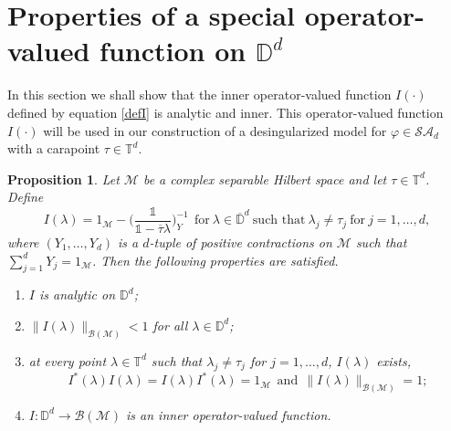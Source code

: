 \documentclass[11pt, reqno]{amsart}
\newtheorem{proposition}[theorem]{Proposition}
\newcommand\1{\boldsymbol {1}}
\numberwithin{equation}{section}
\begin{document}
\section{Properties of a special operator-valued function on $\mathbb{D}^{d}$}\label{Ioflambda}
In this section we shall show that the  inner operator-valued function $I(\cdot)$ defined by equation \eqref{defI}
is analytic and inner. This operator-valued function $I(\cdot)$ will be used in our construction of a desingularized model  for  $\varphi\in\mathcal{SA}_{d}$ with a carapoint $\tau\in\mathbb{T}^{d}$.
\begin{proposition}\label{Ilambdaproperties}
    Let $\mathcal{M}$ be a complex separable  Hilbert space and let $\tau\in\mathbb{T}^{d}$. Define
    \begin{equation}\label{defI}
I(\lambda)=1_{\mathcal{M}}-\bigg(\dfrac{\mathds{1}}{\mathds{1}-\overline{\tau}\lambda}\bigg)^{-1}_{Y}~~\text{for}~\lambda\in\overline{\mathbb{D}}^{d}~\text{such that}~\lambda_{j}\neq\tau_{j}~\text{for}~j=1,\hdots,d,
\end{equation}
where $(Y_{1},\hdots,Y_{d})$ is a $d$-tuple of positive contractions on $\mathcal{M}$ such that $\sum_{j=1}^{d}Y_{j}=1_{\mathcal{M}}$. Then the following properties are satisfied.
\begin{enumerate}
    \item $I$ is analytic on $\mathbb{D}^{d}$;
    \item $\|I(\lambda)\|_{\mathcal{B(M)}}<1$ for all $\lambda\in\mathbb{D}^{d}$;
    \item at every point $\lambda\in\mathbb{T}^{d}$ such that $\lambda_{j}\neq\tau_{j}$ for $j=1,\hdots,d$, $I(\lambda)$ exists, 
    $$I^{*}(\lambda)I(\lambda)=I(\lambda)I^{*}(\lambda)=1_{\mathcal{M}}~~\text{and}~~\|I(\lambda)\|_{\mathcal{B(M)}}=1;$$
    \item $I:\mathbb{D}^{d}\rightarrow \mathcal{B(M)}$ is an inner operator-valued function.
\end{enumerate}
\end{proposition}
\end{document}
